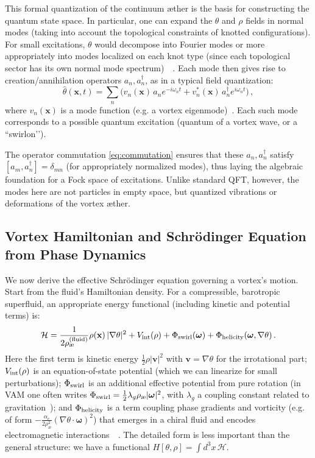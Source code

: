 \documentclass[a4paper,12pt]{article}
\begin{document}
    This formal quantization of the continuum æther is the basis for constructing the quantum state space. In particular, one can expand the $\theta$ and $\rho$ fields in normal modes (taking into account the topological constraints of knotted configurations). For small excitations, $\theta$ would decompose into Fourier modes or more appropriately into modes localized on each knot type (since each topological sector has its own normal mode spectrum)~\cite{reference_59}~\cite{reference_60}. Each mode then gives rise to creation/annihilation operators $a_n, a_n^\dagger$, as in a typical field quantization:
    \[
        \hat{\theta}(\mathbf{x},t) = \sum_n \big( v_n(\mathbf{x})\,a_n e^{-i\omega_n t} + v_n^*(\mathbf{x})\,a_n^\dagger e^{i\omega_n t}\big)\,,
    \]
    where $v_n(\mathbf{x})$ is a mode function (e.g. a vortex eigenmode)~\cite{reference_61}. Each such mode corresponds to a possible quantum excitation (quantum of a vortex wave, or a ``swirlon’’).

    The operator commutation \eqref{eq:commutation} ensures that these $a_n, a_n^\dagger$ satisfy $[a_m, a_n^\dagger] = \delta_{mn}$ (for appropriately normalized modes), thus laying the algebraic foundation for a Fock space of excitations. Unlike standard QFT, however, the modes here are not particles in empty space, but quantized vibrations or deformations of the vortex æther.

    \subsection{Vortex Hamiltonian and Schrödinger Equation from Phase Dynamics}
    We now derive the effective Schrödinger equation governing a vortex’s motion. Start from the fluid’s Hamiltonian density. For a compressible, barotropic superfluid, an appropriate energy functional (including kinetic and potential terms) is:
    \begin{equation}
        \mathcal{H} = \frac{1}{2\rho_{\text{\ae}}^{(\text{fluid})}} \rho(\mathbf{x})\,|\nabla \theta|^2 + V_{\rm int}(\rho) + \Phi_{\rm swirl}(\boldsymbol{\omega}) + \Phi_{\rm helicity}(\boldsymbol{\omega}, \nabla \theta)\,.
        \label{eq:Hamiltonian-density}
    \end{equation}
    Here the first term is kinetic energy $\frac{1}{2} \rho |\mathbf{v}|^2$ with $\mathbf{v}=\nabla \theta$ for the irrotational part; $V_{\rm int}(\rho)$ is an equation-of-state potential (which we can linearize for small perturbations); $\Phi_{\rm swirl}$ is an additional effective potential from pure rotation (in VAM one often writes $\Phi_{\rm swirl} = \frac{1}{2}\lambda_g \rho_{\text{\ae}} |\boldsymbol{\omega}|^2$, with $\lambda_g$ a coupling constant related to gravitation~\cite{reference_62}); and $\Phi_{\rm helicity}$ is a term coupling phase gradients and vorticity (e.g. of form $-\frac{\alpha_e}{2\rho_{\text{\ae}}^2}(\nabla \theta \cdot \boldsymbol{\omega})^2$) that emerges in a chiral fluid and encodes electromagnetic interactions~\cite{reference_63}~\cite{reference_64}. The detailed form is less important than the general structure: we have a functional $H[\theta, \rho] = \int d^3x\, \mathcal{H}$.
\end{document}
